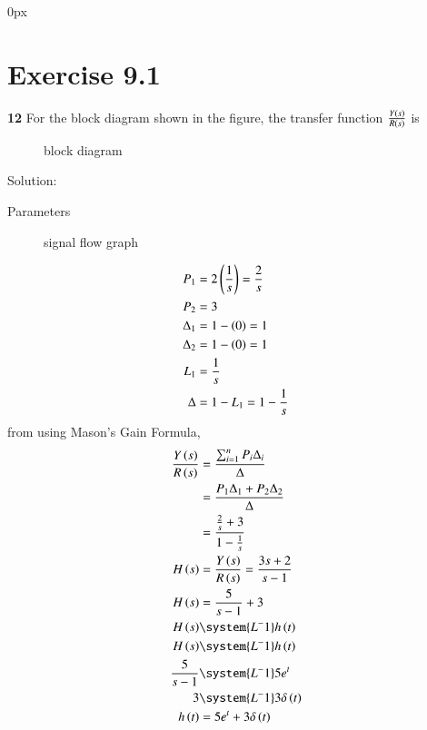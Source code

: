 \documentclass[journal,12pt,twocolumn]{IEEEtran}
\theoremstyle{remark}
\begin{document}
\parindent 0px


\vspace{3cm}

\title{}
\author{EE23BTECH11217 - Prajwal M$^{*}$
}
\maketitle
\newpage
\bigskip



\section*{Exercise 9.1}

\noindent \textbf{12} \hspace{2pt}For the block diagram shown in the figure, the transfer function $\frac{Y\left(s\right)}{R\left(s\right)}$ is \\
\begin{figure}[h]
    \centering
    
    \caption{block diagram}
    \label{fig:9.1.12.1}
\end{figure}

Solution:\\
\begin{table}[h]
    \centering
    
    \caption{Parameters}
    \label{tab:9.1.12.1}
\end{table}

\begin{figure}[h]
    \centering
    
    \caption{signal flow graph}
    \label{fig: 9.1.12.2}
\end{figure}
\begin{align}
    P_1 & = 2\left(\frac{1}{s}\right) = \frac{2}{s}\\
    P_2 & = 3\\
    \Delta_1 & = 1 - \left(0\right) = 1\\
    \Delta_2 & = 1 - \left(0\right) = 1\\
    L_1 & = \frac{1}{s}\\
    \Delta & = 1 - L_1 = 1 - \frac{1}{s}
\end{align}
from  using Mason's Gain Formula,
\begin{align}
    \frac{Y\brak{s}}{R\brak{s}} & = \frac{{\sum_{i=1}^{n} P_i\Delta_i}}{{\Delta}}\\
    & = \frac{P_1\Delta_1 + P_2\Delta_2}{\Delta}\\
    & = \frac{\frac{2}{s} + 3}{1 - \frac{1}{s}}\\
    H\brak{s} & = \frac{Y\brak{s}}{R\brak{s}} = \frac{3s+2}{s-1}\\
    H\brak{s} & = \frac{5}{s-1} + 3\\
    H\brak{s} & \system{L^-1} h\brak{t}\\
    H\brak{s} &\system{L^-1} h\brak{t}\\
    \frac{5}{s-1} & \system{L^-1} 5e^t\\
    3 & \system{L^-1} 3\delta\brak{t}\\
    h\brak{t} & = 5e^t + 3\delta\brak{t}
\end{align}
\end{document}
